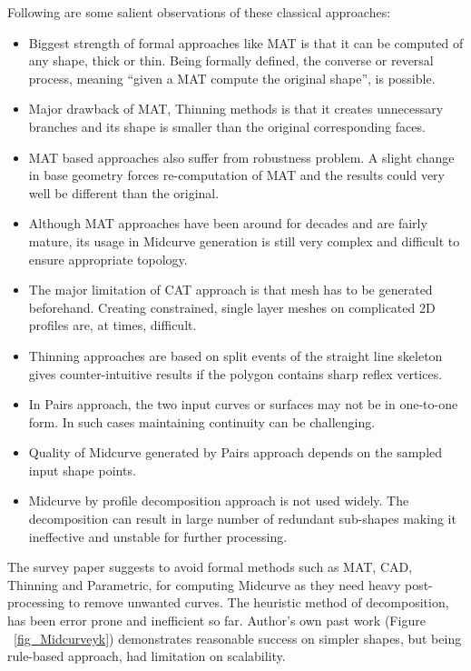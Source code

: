 \documentclass[9pt,academicons]{article}
\begin{document}
Following are some salient observations of these classical approaches:
\begin{itemize}[noitemsep,topsep=2pt,parsep=2pt,partopsep=2pt]
	\item Biggest strength of formal approaches like MAT is that it can be computed of any shape, thick or thin. Being formally defined, the converse or reversal process, meaning ``given a MAT compute the original shape'', is possible.
	\item Major drawback of MAT, Thinning methods is that it creates unnecessary branches and its shape is smaller than the original corresponding faces.
	\item  MAT based approaches also suffer from robustness problem. A slight change in base geometry forces re-computation of MAT and the results could very well be different than the original.
	\item Although MAT approaches have been around for decades and are fairly mature, its usage in Midcurve generation is still very complex and difficult to ensure appropriate topology.
	\item The major limitation of CAT approach is that mesh has to be generated beforehand. Creating constrained, single layer meshes on complicated 2D profiles are, at times, difficult.
	\item Thinning approaches are based on split events of the straight line skeleton gives counter-intuitive results if the polygon contains sharp reflex vertices.
	\item In Pairs approach, the two input curves or surfaces may not be in one-to-one form. In such cases maintaining continuity can be challenging.
	\item Quality of Midcurve generated by Pairs approach depends on the sampled input shape points.
\item Midcurve by profile decomposition approach is not used widely. The decomposition can result in large number of redundant sub-shapes making it ineffective and unstable for further processing.
\end{itemize}


The survey paper \cite{medial2010} suggests to avoid formal methods such as MAT, CAD, Thinning and Parametric, for computing Midcurve as they need heavy post-processing to remove unwanted curves. The heuristic method of decomposition,  has been error prone and inefficient so far. Author's own past work (Figure ~\ref{fig_Midcurveyk}) demonstrates reasonable success on simpler shapes, but being rule-based approach, had limitation on scalability.
\end{document}
